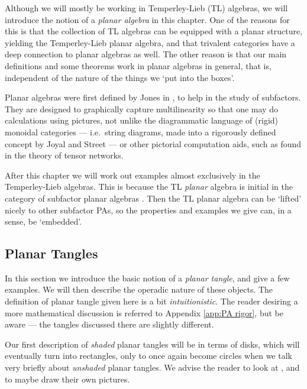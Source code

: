 Although we will mostly be working in Temperley-Lieb (TL) algebras, we will introduce the notion of a \emph{planar algebra} in this chapter. One of the reasons for this is that the collection of TL algebras can be equipped with a planar structure, yielding the Temperley-Lieb planar algebra, and that trivalent categories have a deep connection to planar algebras as well. The other reason is that our main definitions and some theorems work in planar algebras in general, that is, independent of the nature of the things we `put into the boxes'.

Planar algebras were first defined by Jones in \cite{jones1999planar1}, to help in the study of subfactors. They are designed to graphically capture multilinearity so that one may do calculations using pictures, not unlike the diagrammatic language of (rigid) monoidal categories --- i.e.\ string diagrams, made into a rigorously defined concept by Joyal and Street \cite{joyal1991geometry} --- or other pictorial computation aids, such as found in the theory of tensor networks.

After this chapter we will work out examples almost exclusively in the Temperley-Lieb algebras. This is because the TL \emph{planar} algebra is initial in the category of subfactor planar algebras \cite{peters2010planar}. Then the TL planar algebra can be `lifted' nicely to other subfactor PAs, so the properties and examples we give can, in a sense, be `embedded'.

\subsection{Planar Tangles}
In this section we introduce the basic notion of a \emph{planar tangle}, and give a few examples. We will then describe the operadic nature of these objects. The definition of planar tangle given here is a bit \emph{intuitionistic}. The reader desiring a more mathematical discussion is referred to \textsf{Appendix \ref{app:PA rigor}}, but be aware --- the tangles discussed there are slightly different.

Our first description of \emph{shaded} planar tangles will be in terms of disks, which will eventually turn into rectangles, only to once again become circles when we talk very briefly about \emph{unshaded} planar tangles. We advise the reader to look at , and to maybe draw their own pictures.

